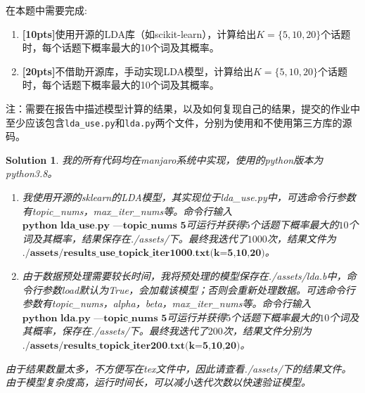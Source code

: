 \documentclass[a4paper,UTF8]{article}
\newtheorem*{solution}{Solution}
\numberwithin{equation}{section}
\begin{document}
在本题中需要完成:
\begin{enumerate}
    \item \textbf{[10pts]}使用开源的LDA库（如scikit-learn），计算给出$K=\{5, 10, 20\}$个话题时，每个话题下概率最大的10个词及其概率。
    \item \textbf{[20pts]}不借助开源库，手动实现LDA模型，计算给出$K=\{5, 10, 20\}$个话题时，每个话题下概率最大的10个词及其概率。
\end{enumerate}
注：需要在报告中描述模型计算的结果，以及如何复现自己的结果，提交的作业中至少应该包含\texttt{lda\_use.py}和\texttt{lda.py}两个文件，分别为使用和不使用第三方库的源码。
\begin{solution}我的所有代码均在manjaro系统中实现，使用的python版本为python3.8。
	\begin{enumerate}
		\item 我使用开源的sklearn的LDA模型，其实现位于lda\_use.py中，可选命令行参数有topic\_nums，max\_iter\_nums等。命令行输入$\textbf{python lda\_use.py ---topic\_nums 5}$可运行并获得$5$个话题下概率最大的$10$个词及其概率，结果保存在./assets/下。最终我迭代了$1000$次，结果文件为$\textbf{./assets/results\_use\_topick\_iter1000.txt(k=5,10,20)}$。
		\item 由于数据预处理需要较长时间，我将预处理的模型保存在./assets/lda.b中，命令行参数load默认为True，会加载该模型；否则会重新处理数据。可选命令行参数有topic\_nums，alpha，beta，max\_iter\_nums等。命令行输入$\textbf{python lda.py ---topic\_nums 5}$可运行并获得$5$个话题下概率最大的$10$个词及其概率，保存在./assets/下。最终我迭代了$200$次，结果文件分别为$\textbf{./assets/results\_topick\_iter200.txt(k=5,10,20)}$。
	\end{enumerate}
    由于结果数量太多，不方便写在tex文件中，因此请查看./assets/下的结果文件。由于模型复杂度高，运行时间长，可以减小迭代次数以快速验证模型。
\end{solution}
\newpage


\end{document}
